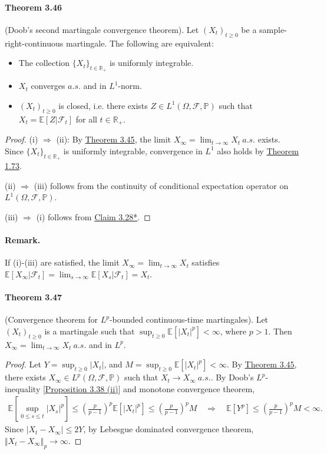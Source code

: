 \documentclass{article}
\numberwithin{equation}{section}
\newcommand{\E}{\mathbb{E}}
\renewcommand{\P}{\mathbb{P}}
\theoremstyle{plain}
\theoremstyle{definition}
\begin{document}
\paragraph{Theorem 3.46\label{thm:3.46}} (Doob's second martingale convergence theorem). Let $(X_t)_{t\geq 0}$ be a sample-right-continuous martingale. The following are equivalent:
\begin{itemize}
	\item[(i)] The collection $\{X_t\}_{t\in\mathbb{R}_+}$ is uniformly integrable.
	\item[(ii)] $X_t$ converges $a.s.$ and in $L^1$-norm.
	\item[(iii)] $(X_t)_{t\geq 0}$ is closed, i.e. there exists $Z\in L^1(\Omega,\mathscr{F},\P)$ such that $X_t=\E[Z|\mathscr{F}_t]$ for all $t\in\mathbb{R}_+$.
\end{itemize}
\begin{proof}
(i) $\Rightarrow$ (ii): By \hyperref[thm:3.45]{Theorem 3.45}, the limit $X_\infty=\lim_{t\to\infty} X_t\ a.s.$ exists. Since $\{X_t\}_{t\in\mathbb{R}_+}$ is uniformly integrable, convergence in $L^1$ also holds by \hyperref[thm:1.73]{Theorem 1.73}.

(ii) $\Rightarrow$ (iii) follows from the continuity of conditional expectation operator on $L^1(\Omega,\mathscr{F},\P)$.

(iii) $\Rightarrow$ (i) follows from \hyperref[claim:3.28]{Claim 3.28*}.
\end{proof}
\paragraph{Remark.} If (i)-(iii) are satisfied, the limit $X_\infty=\lim_{t\to\infty} X_t$ satisfies $\E[X_\infty|\mathscr{F}_t]=\lim_{s\to\infty}\E[X_s|\mathscr{F}_t]=X_t$.

\paragraph{Theorem 3.47\label{thm:3.47}} (Convergence theorem for $L^p$-bounded continuous-time martingales). Let $(X_t)_{t\geq 0}$ is a martingale such that $\sup_{t\geq 0}\E[\vert X_t\vert^p]<\infty$, where $p>1$. Then $X_\infty=\lim_{t\to\infty} X_t\ a.s.$ and in $L^p$.
\begin{proof}
Let $Y=\sup_{t\geq 0}\vert X_t\vert$, and $M=\sup_{t\geq 0}\E[\vert X_t\vert^p]<\infty$. By \hyperref[thm:3.46]{Theorem 3.45}, there exists $X_\infty\in L^p(\Omega,\mathscr{F},\P)$ such that $X_t\to X_\infty\ a.s.$. By Doob's $L^p$-inequality [\hyperref[prop:3.38]{Proposition 3.38 (ii)}] and monotone convergence theorem,
\begin{align*}
	\E\left[\sup_{0\leq s\leq t}\vert X_s\vert^p\right]\leq\left(\frac{p}{p-1}\right)^p\E[\vert X_t\vert^p]\leq\left(\frac{p}{p-1}\right)^p M\quad\Rightarrow\quad \E[Y^p]\leq\left(\frac{p}{p-1}\right)^p M<\infty.
\end{align*}
Since $\vert X_t-X_\infty\vert \leq 2Y$, by Lebesgue dominated convergence theorem, $\Vert X_t-X_\infty\Vert_p\to\infty$.
\end{proof}
\end{document}
